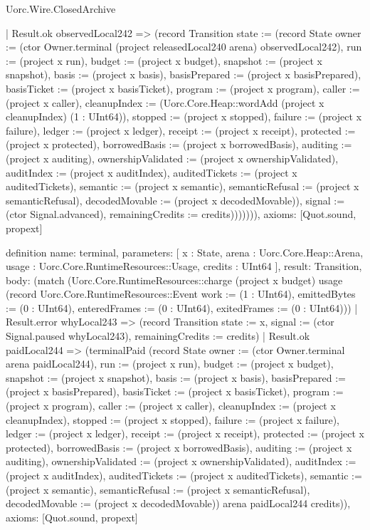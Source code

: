 \begin{lexlean}{Uorc.Wire.ClosedArchive}
\begin{semanticmodule}
{      | Result.ok observedLocal242 => (record Transition {state := (record State {owner := (ctor Owner.terminal (project releasedLocal240 arena) observedLocal242), run := (project x run), budget := (project x budget), snapshot := (project x snapshot), basis := (project x basis), basisPrepared := (project x basisPrepared), basisTicket := (project x basisTicket), program := (project x program), caller := (project x caller), cleanupIndex := (Uorc.Core.Heap::wordAdd (project x cleanupIndex) (1 : UInt64)), stopped := (project x stopped), failure := (project x failure), ledger := (project x ledger), receipt := (project x receipt), protected := (project x protected), borrowedBasis := (project x borrowedBasis), auditing := (project x auditing), ownershipValidated := (project x ownershipValidated), auditIndex := (project x auditIndex), auditedTickets := (project x auditedTickets), semantic := (project x semantic), semanticRefusal := (project x semanticRefusal), decodedMovable := (project x decodedMovable)}), signal := (ctor Signal.advanced), remainingCredits := credits}))))))),
  axioms: [Quot.sound, propext]
}

definition{
  name: terminal,
  parameters: [
    x : State,
    arena : Uorc.Core.Heap::Arena,
    usage : Uorc.Core.RuntimeResources::Usage,
    credits : UInt64
  ],
  result: Transition,
  body: (match (Uorc.Core.RuntimeResources::charge (project x budget) usage (record Uorc.Core.RuntimeResources::Event {work := (1 : UInt64), emittedBytes := (0 : UInt64), enteredFrames := (0 : UInt64), exitedFrames := (0 : UInt64)}))
    | Result.error whyLocal243 => (record Transition {state := x, signal := (ctor Signal.paused whyLocal243), remainingCredits := credits})
    | Result.ok paidLocal244 => (terminalPaid (record State {owner := (ctor Owner.terminal arena paidLocal244), run := (project x run), budget := (project x budget), snapshot := (project x snapshot), basis := (project x basis), basisPrepared := (project x basisPrepared), basisTicket := (project x basisTicket), program := (project x program), caller := (project x caller), cleanupIndex := (project x cleanupIndex), stopped := (project x stopped), failure := (project x failure), ledger := (project x ledger), receipt := (project x receipt), protected := (project x protected), borrowedBasis := (project x borrowedBasis), auditing := (project x auditing), ownershipValidated := (project x ownershipValidated), auditIndex := (project x auditIndex), auditedTickets := (project x auditedTickets), semantic := (project x semantic), semanticRefusal := (project x semanticRefusal), decodedMovable := (project x decodedMovable)}) arena paidLocal244 credits)),
  axioms: [Quot.sound, propext]
}


\end{semanticmodule}
\end{lexlean}
